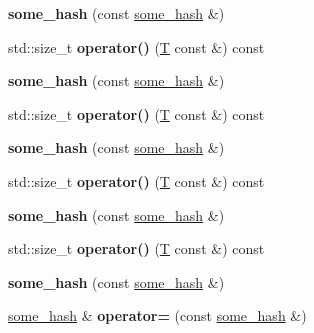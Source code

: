 \begin{DoxyCompactItemize}
{\bfseries some\+\_\+hash} (const \mbox{\hyperlink{structsome__hash}{some\+\_\+hash}} \&)
\item 
\mbox{\label{structsome__hash_a2796c87fba10362bbbcf115a7166ecc0}} 
std\+::size\+\_\+t {\bfseries operator()} (\mbox{\hyperlink{struct_t}{T}} const \&) const
\item 
\mbox{\label{structsome__hash_a723612fc40aa55a03af0ba2a04ba66c2}} 
{\bfseries some\+\_\+hash} (const \mbox{\hyperlink{structsome__hash}{some\+\_\+hash}} \&)
\item 
\mbox{\label{structsome__hash_a2796c87fba10362bbbcf115a7166ecc0}} 
std\+::size\+\_\+t {\bfseries operator()} (\mbox{\hyperlink{struct_t}{T}} const \&) const
\item 
\mbox{\label{structsome__hash_a723612fc40aa55a03af0ba2a04ba66c2}} 
{\bfseries some\+\_\+hash} (const \mbox{\hyperlink{structsome__hash}{some\+\_\+hash}} \&)
\item 
\mbox{\label{structsome__hash_a2796c87fba10362bbbcf115a7166ecc0}} 
std\+::size\+\_\+t {\bfseries operator()} (\mbox{\hyperlink{struct_t}{T}} const \&) const
\item 
\mbox{\label{structsome__hash_a723612fc40aa55a03af0ba2a04ba66c2}} 
{\bfseries some\+\_\+hash} (const \mbox{\hyperlink{structsome__hash}{some\+\_\+hash}} \&)
\item 
\mbox{\label{structsome__hash_a2796c87fba10362bbbcf115a7166ecc0}} 
std\+::size\+\_\+t {\bfseries operator()} (\mbox{\hyperlink{struct_t}{T}} const \&) const
\item 
\mbox{\label{structsome__hash_a723612fc40aa55a03af0ba2a04ba66c2}} 
{\bfseries some\+\_\+hash} (const \mbox{\hyperlink{structsome__hash}{some\+\_\+hash}} \&)
\item 
\mbox{\label{structsome__hash_a0cea7e5f4ab9f595fe686e3d1356969a}} 
\mbox{\hyperlink{structsome__hash}{some\+\_\+hash}} \& {\bfseries operator=} (const \mbox{\hyperlink{structsome__hash}{some\+\_\+hash}} \&)
\item 
\mbox{\label{structsome__hash_a2796c87fba10362bbbcf115a7166ecc0}} 

\end{DoxyCompactItemize}
